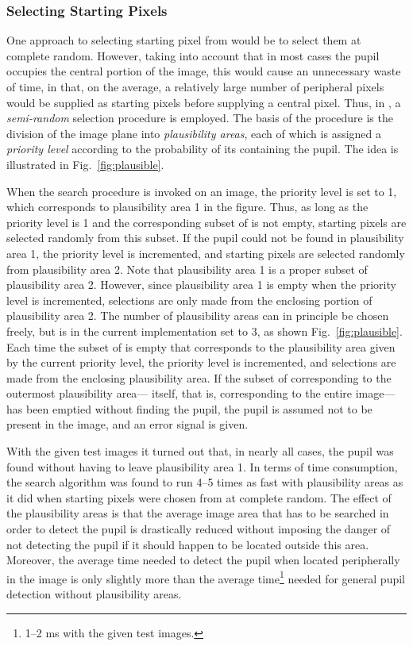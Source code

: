 \subsubsection{Selecting Starting Pixels}

One approach to selecting starting pixel from {\SS} would be to select
them at complete random.  However, taking into account that in most
cases the pupil occupies the central portion of the image, this would
cause an unnecessary waste of time, in that, on the average, a
relatively large number of peripheral pixels would be supplied as
starting pixels before supplying a central pixel.  Thus, in
{\octopus}, a {\em semi-random\/} selection procedure is employed.
The basis of the procedure is the division of the image plane into
{\em plausibility areas\/}, each of which is assigned a {\em priority
  level\/} according to the probability of its containing the pupil.
The idea is illustrated in Fig.~\ref{fig:plausible}.  

When the search procedure is invoked on an image, the priority level
is set to 1, which corresponds to plausibility area 1 in the figure.
Thus, as long as the priority level is 1 and the corresponding subset
of {\SS} is not empty, starting pixels are selected randomly from this
subset.  If the pupil could not be found in plausibility area 1, the
priority level is incremented, and starting pixels are selected
randomly from plausibility area 2.  Note that plausibility area 1 is a
proper subset of plausibility area 2.  However, since plausibility
area 1 is empty when the priority level is incremented, selections are
only made from the enclosing portion of plausibility area 2.  The
number of plausibility areas can in principle be chosen freely, but is
in the current implementation set to 3, as shown
Fig.~\ref{fig:plausible}.  Each time the subset of {\SS} is empty that
corresponds to the plausibility area given by the current priority
level, the priority level is incremented, and selections are made from
the enclosing plausibility area.  If the subset of {\SS} corresponding
to the outermost plausibility area---{\SS} itself, that is,
corresponding to the entire image---has been emptied without finding
the pupil, the pupil is assumed not to be present in the image, and an
error signal is given.

With the given test images it turned out that, in nearly all cases,
the pupil was found without having to leave plausibility area 1.  In
terms of time consumption, the search algorithm was found to run 4--5
times as fast with plausibility areas as it did when starting pixels
were chosen from {\SS} at complete random.  The effect of the
plausibility areas is that the average image area that has to be
searched in order to detect the pupil is drastically reduced without
imposing the danger of not detecting the pupil if it should happen to
be located outside this area.  Moreover, the average time needed to
detect the pupil when located peripherally in the image is only
slightly more than the average time\footnote{1--2 ms with the given
  test images.} needed for general pupil detection without
plausibility areas.

